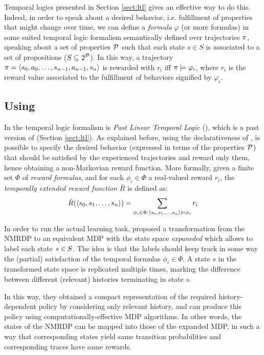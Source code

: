 Temporal logics presented in Section \ref{sect:ltl} gives an effective way to do this. 
Indeed, in order to speak about a desired behavior,  i.e. fulfillment of properties that might change over time, we can define a \emph{formula} $\varphi$ (or more formulas) in some suited temporal logic formalism semantically defined over trajectories $\pi$, speaking about a set of properties $\mathcal{P}$ such that each state $s\in S$ is associated to a set of propositions ($S\subseteq 2^{\mathcal{P}}$). 
In this way, a trajectory $\pi = \langle s_0, a_0, \dots, s_{n-1}, a_{n-1}, s_n \rangle$ is rewarded with $r_i$ iff $\pi \models \varphi_i$, where $r_i$ is the reward value associated to the fulfillment of behaviors signified by $\varphi_i$.

\subsection{Using \PLTL}
\label{sect:using-pltl}
In \citep{bacchus1996rewarding} the temporal logic formalism is \emph{Past Linear Temporal Logic} (\PLTL), which is a past version of \LTL (Section \ref{sect:ltl}).
As explained before, using the declarativeness of \PLTL, is possible to specify the desired behavior (expressed in terms of the properties $\mathcal{P}$) that should be satisfied by the experienced trajectories and reward only them, hence obtaining a non-Markovian reward function. More formally, given a finite set $\Phi$ of \PLTL \emph{reward formulas}, and for each $\phi_i \in \Phi$ a real-valued reward $r_i$, the \emph{temporally extended reward function} $\bar{R}$ is defined as:
\begin{equation}\label{pltl-temp-extended-reward-fun}
\bar{R}(\langle s_0, s_1, \dots, s_n \rangle) = \sum_{\phi_i \in \Phi : \langle s_0, s_1, \dots, s_n \rangle\models \phi_i} r_i
\end{equation}


In order to run the actual learning task, \citep{bacchus1996rewarding} proposed a transformation from the NMRDP to an equivalent MDP with the state space \emph{expaneded} which allows to label each state $s\in S$. The idea is that the labels should 
keep track in some way the (partial) satisfaction of the temporal formulas $\phi_i \in \Phi$. 
A state $s$ in the transformed state space is replicated multiple times, marking the difference between different (relevant) histories terminating in state $s$.

In this way, they obtained a compact representation of the required history-dependent policy
by considering only relevant history, and can produce this
policy using computationally-effective MDP algorithms.
In other words, the states of the NMRDP can be mapped into those of the expanded MDP, 
in such a way that corresponding states yield
same transition probabilities and corresponding traces have same rewards.

